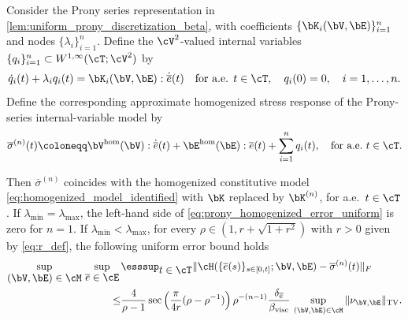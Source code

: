 \begin{proposition}
\label{prop:uniform_prony_homogenized_model}
Consider the Prony series representation in \cref{lem:uniform_prony_discretization_beta},
with coefficients $\{\bK_i(\bV,\bE)\}_{i=1}^{n}$ and nodes $\{\lambda_i\}_{i=1}^{n}$. Define the $\cV^{2}$-valued internal variables $\{q_i\}_{i=1}^{n}\subset W^{1,\infty}(\cT;\cV^{2})$ by
\begin{equation}\label{eq:q_i_ode}
\dot{q}_i(t)+\lambda_i q_i(t)=\bK_i(\bV,\bE):\dot{\overline{e}}(t)\quad\text{for a.e. }t\in\cT,\quad q_i(0)=0,\quad i=1,\dots,n.
\end{equation}
Define the corresponding approximate homogenized stress response of the Prony-series internal-variable model by
\begin{equation}\label{eq:prony_homogenized_model}
\overline{\sigma}^{(n)}(t)
\coloneqq
\bV^{\rm hom}(\bV):\dot{\overline{e}}(t)
+\bE^{\rm hom}(\bE):\overline{e}(t)
+\sum_{i=1}^{n} q_i(t),\quad \text{for a.e.\ }t\in\cT.
\end{equation}

Then $\overline{\sigma}^{(n)}$ coincides with the homogenized constitutive model \cref{eq:homogenized_model_identified}
with $\bK$ replaced by $\bK^{(n)}$, for a.e.\ $t\in\cT$. If $\lambda_{\min}=\lambda_{\max}$, the left-hand side of \cref{eq:prony_homogenized_error_uniform} is zero for $n=1$. If $\lambda_{\min}<\lambda_{\max}$, for every $\rho\in(1, r+\sqrt{1+r^2})$ with $r>0$ given by \cref{eq:r_def}, the following uniform error bound holds
\begin{align}\label{eq:prony_homogenized_error_uniform}
\sup_{\displaystyle(\bV,\bE)\in\cM}\,\sup_{\displaystyle\overline{e}\in\cE}\,&\esssup_{\displaystyle t\in\cT}
\|\cH(\{\overline{e}(s)\}_{s\in[0,t]};\bV,\bE)-\overline{\sigma}^{(n)}(t)\|_F \nonumber \\
\leq
&\frac{4}{\rho-1}
\sec\left(\frac{\pi}{4r}(\rho-\rho^{-1})
\right)
\rho^{-(n-1)}
\frac{\delta_{\overline{e}}}{\beta_{\rm visc}}\,\sup_{(\bV,\bE)\in\cM}\|\nu_{\bV,\bE}\|_{\mathrm{TV}}.
\end{align}
\end{proposition}

